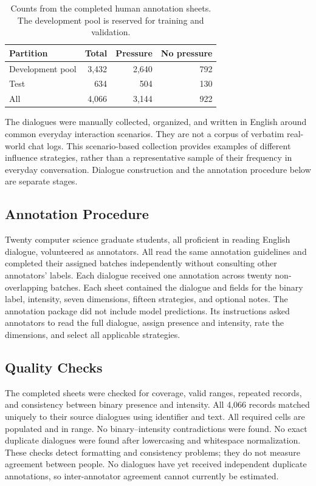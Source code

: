 \documentclass[11pt]{article}
\begin{document}
\begin{table}[t]
\centering\small
\setlength{\tabcolsep}{3pt}
\begin{tabular}{@{}lrrr@{}}
\toprule
\textbf{Partition} & \textbf{Total} & \textbf{Pressure} & \textbf{No pressure}\\
\midrule
Development pool & 3,432 & 2,640 & 792\\
Test & 634 & 504 & 130\\
\midrule
All & 4,066 & 3,144 & 922\\
\bottomrule
\end{tabular}
\caption{Counts from the completed human annotation sheets. The development
pool is reserved for training and validation.}
\label{tab:composition}
\end{table}

The dialogues were manually collected, organized, and written in English
around common everyday interaction scenarios. They are not a corpus of
verbatim real-world chat logs. This scenario-based collection provides
examples of different influence strategies, rather than a representative
sample of their frequency in everyday conversation. Dialogue construction
and the annotation procedure below are separate stages.

\subsection{Annotation Procedure}
Twenty computer science graduate students, all proficient in reading
English dialogue, volunteered as annotators. All read the same annotation
guidelines and completed their assigned batches independently without
consulting other annotators' labels. Each dialogue received one annotation
across twenty non-overlapping batches. Each sheet
contained the dialogue and fields for the binary label, intensity, seven
dimensions, fifteen strategies, and optional notes. The annotation package
did not include model predictions. Its instructions asked annotators to read
the full dialogue, assign presence and intensity, rate the dimensions, and
select all applicable strategies.

\subsection{Quality Checks}
The completed sheets were checked for coverage, valid ranges, repeated
records, and consistency between binary presence and intensity. All 4,066
records matched uniquely to their source dialogues using identifier and
text. All required cells are populated and in range. No binary--intensity
contradictions were found. No exact duplicate dialogues were found after
lowercasing and whitespace normalization. These checks detect formatting
and consistency problems; they do not measure agreement between people.
No dialogues have yet received independent duplicate annotations, so
inter-annotator agreement cannot currently be estimated.
\end{document}
